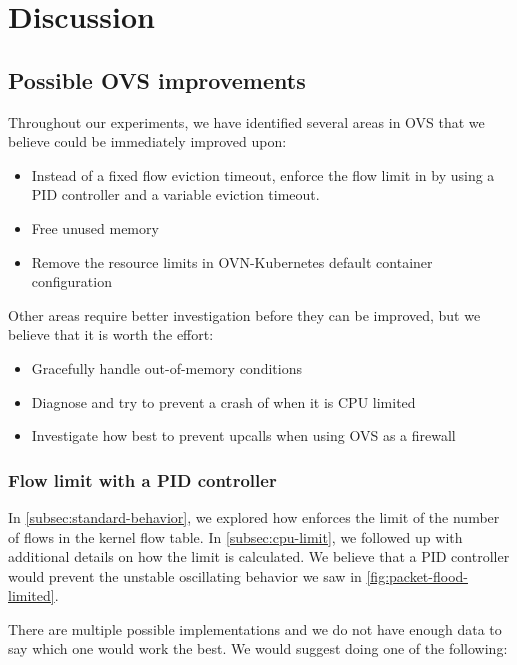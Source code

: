 \chapter{Discussion}
\label{chap:discussion}

\section{Possible OVS improvements}

Throughout our experiments, we have identified several areas in OVS that we believe could be immediately improved upon:

\begin{itemize}
    \item Instead of a fixed flow eviction timeout, enforce the flow limit in  by using a PID controller and a variable eviction timeout.
    \item Free unused memory
    \item Remove the resource limits in OVN-Kubernetes default container configuration
\end{itemize}

Other areas require better investigation before they can be improved, but we believe that it is worth the effort:

\begin{itemize}
    \item Gracefully handle out-of-memory conditions
    \item Diagnose and try to prevent a crash of  when it is CPU limited
    \item Investigate how best to prevent upcalls when using OVS as a firewall
\end{itemize}

\subsection{Flow limit with a PID controller}

In \cref{subsec:standard-behavior}, we explored how  enforces the limit of the number of flows in the kernel flow table. In \cref{subsec:cpu-limit}, we followed up with additional details on how the limit is calculated. We believe that a PID controller would prevent the unstable oscillating behavior we saw in \cref{fig:packet-flood-limited}.

There are multiple possible implementations and we do not have enough data to say which one would work the best. We would suggest doing one of the following:

